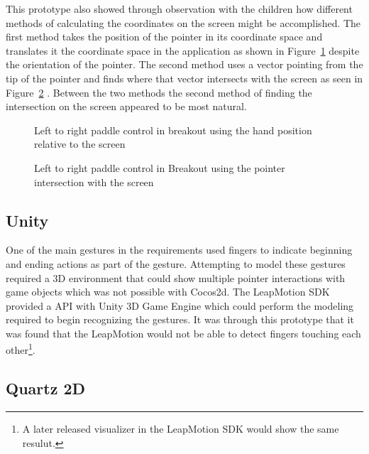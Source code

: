 This prototype also showed through observation with the children how different methods of calculating the coordinates on the screen might be accomplished. The first method takes the position of the pointer in its coordinate space and translates it the coordinate space in the application as shown in Figure~\ref{fig:HandPosition} despite the orientation of the pointer. The second method uses a vector pointing from the tip of the pointer and finds where that vector intersects with the screen as seen in Figure~\ref{fig:PointerIntersect} . Between the two methods the second method of finding the intersection on the screen appeared to be most natural. 

\begin{figure}
\centering     %
{}
\caption{Left to right paddle control in breakout using the hand position relative to the screen }
\label{fig:HandPosition}
\end{figure}

\begin{figure}
\centering     %
{}
\caption{Left to right paddle control in Breakout using the pointer intersection with the screen }
\label{fig:PointerIntersect}
\end{figure}

\subsection{Unity}\label{unity_prototype}
One of the main gestures in the requirements used fingers to indicate beginning and ending actions as part of the gesture. Attempting to model these gestures required a 3D environment that could show multiple pointer interactions with game objects which was not possible with Cocos2d. The LeapMotion SDK provided a API with Unity 3D Game Engine which could perform the modeling required to begin recognizing the gestures. It was through this prototype that it was found that the LeapMotion would not be able to detect fingers touching each other\footnote{A later released visualizer in the LeapMotion SDK would show the same resulut.}. \cite{unity}

\subsection{Quartz 2D}\label{quartz2d_prototype}

